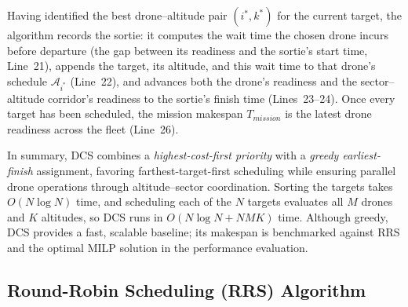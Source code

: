 \documentclass[subscriptcorrection,upint,nolists, varvw,barcolor=Goldenrod3,mathalfa=cal=euler,balance,hyphenate,french]{asmejour} %
\begin{document}
Having identified the best drone–altitude pair $(i^\ast, k^\ast)$ for the current target, the algorithm records the sortie: it computes the wait time the chosen drone incurs before departure (the gap between its readiness and the sortie's start time, Line~21), appends the target, its altitude, and this wait time to that drone's schedule $\mathcal{A}_{i^\ast}$ (Line~22), and advances both the drone's readiness and the sector–altitude corridor's readiness to the sortie's finish time (Lines~23–24). Once every target has been scheduled, the mission makespan $T_{\mathit{mission}}$ is the latest drone readiness across the fleet (Line~26).

In summary, DCS combines a \textit{highest-cost-first priority} with a \textit{greedy earliest-finish} assignment, favoring farthest-target-first scheduling while ensuring parallel drone operations through altitude–sector coordination.
Sorting the targets takes $O(N\log N)$ time, and scheduling each of the $N$ targets evaluates all $M$ drones and $K$ altitudes, so DCS runs in $O(N\log N + NMK)$ time.
Although greedy, DCS provides a fast, scalable baseline; its makespan is benchmarked against RRS and the optimal MILP solution in the performance evaluation.



\subsection{Round-Robin Scheduling (RRS) Algorithm}

\end{document}
